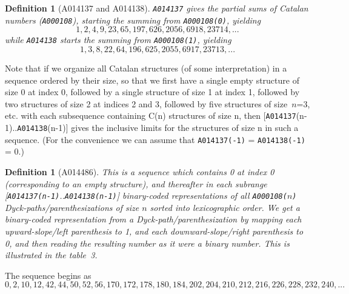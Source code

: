 \documentclass[11pt]{article} %
\newcommand{\EISseq}[1]{{\tt #1}}
\newtheorem{definition}[theorem]{Definition}
\begin{document}
\begin{definition}[{A014137 and A014138}]
\normalfont


\EISseq{A014137} gives the partial sums of Catalan numbers (\EISseq{A000108}),
starting the summing from \EISseq{A000108(0)}, yielding
$$
    1,2,4,9,23,65,197,626,2056,6918,23714,... 
$$
while \EISseq{A014138} starts the summing from \EISseq{A000108(1)}, yielding
$$
    1,3,8,22,64,196,625,2055,6917,23713,... 
$$
\end{definition}

Note that if we organize all Catalan structures (of some
interpretation) in a sequence ordered by their size, so that we first
have a single empty structure of size 0 at index 0, followed by a
single structure of size 1 at index 1, followed by two structures of
size 2 at indices 2 and 3, followed by five structures of size~$n$=3, etc.
with each subsequence containing C(n) structures of size n, then
[\EISseq{A014137}(n-1)..\EISseq{A014138}(n-1)] gives the inclusive limits for the
structures of size n in such a sequence. (For the convenience we can
assume that \EISseq{A014137(-1)} = \EISseq{A014138(-1)} = 0.)


\begin{definition}[{A014486}]
\normalfont

This is a sequence which contains 0 at index 0 (corresponding to an
empty structure), and thereafter in each subrange
[\EISseq{A014137(n-1)}..\EISseq{A014138(n-1)}]
binary-coded representations of all \EISseq{A000108($n$)}
Dyck-paths/parenthesizations of size $n$ sorted into lexicographic
order. We get a binary-coded representation from a
Dyck-path/parenthesization by mapping each upward-slope/left
parenthesis to 1, and each downward-slope/right parenthesis to 0, and
then reading the resulting number as it were a binary number.
This is illustrated in the table~3.
\end{definition}

The sequence begins as
$$
0,2,10,12,42,44,50,52,56,170,172,178,180,184,202,204,210,212,216,226,228,232,240,...
$$
\end{document}
